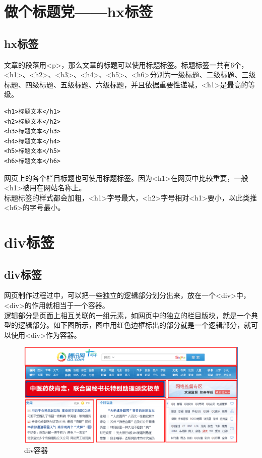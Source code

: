 \newpage

\section{做个标题党——hx标签}

\subsection{hx标签}

文章的段落用<p>，那么文章的标题可以使用标题标签。标题标签一共有6个，<h1>、<h2>、<h3>、<h4>、<h5>、<h6>分别为一级标题、二级标题、三级标题、四级标题、五级标题、六级标题，并且依据重要性递减，<h1>是最高的等级。 \\

\begin{lstlisting}[style=htmlcssjs]
<h1>标题文本</h1>
<h2>标题文本</h2>
<h3>标题文本</h3>
<h4>标题文本</h4>
<h5>标题文本</h5>
<h6>标题文本</h6>
\end{lstlisting}

网页上的各个栏目标题也可使用标题标签。因为<h1>在网页中比较重要，一般<h1>被用在网站名称上。 \\

标题标签的样式都会加粗，<h1>字号最大，<h2>字号相对<h1>要小，以此类推<h6>的字号最小。

\newpage

\section{div标签}

\subsection{div标签}

网页制作过程过中，可以把一些独立的逻辑部分划分出来，放在一个<div>中，<div>的作用就相当于一个容器。 \\

逻辑部分是页面上相互关联的一组元素，如网页中的独立的栏目版块，就是一个典型的逻辑部分。如下图所示，图中用红色边框标出的部分就是一个逻辑部分，就可以使用<div>作为容器。 \\

\begin{figure}[H]
	\centering
	\includegraphics[scale=0.5]{img/C2/2-3/1.png}
	\caption{div容器}
\end{figure}

